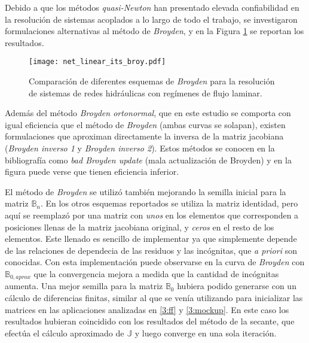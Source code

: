 Debido a que los métodos \textit{quasi-Newton} han presentado elevada confiabilidad en la resolución de sistemas acoplados a lo largo de todo el trabajo,
se investigaron formulaciones alternativas al método de \textit{Broyden},
y en la Figura \ref{net_linear_its_broy} se reportan los resultados.

\begin{figure}[ht]
\centering
\texttt{[image: net\_linear\_its\_broy.pdf]}
\caption[Comparación de diferentes esquemas de \textit{Broyden} para la resolución de sistemas de redes hidráulicas con regímenes de flujo laminar]
{Comparación de diferentes esquemas de \textit{Broyden} para la resolución de sistemas de redes hidráulicas con regímenes de flujo laminar.}
	\label{net_linear_its_broy}
\end{figure}

Además del método \textit{Broyden ortonormal}, que en este estudio se comporta con igual eficiencia que el método de \textit{Broyden} (ambas curvas se solapan),
existen formulaciones que aproximan directamente la inversa de la matriz jacobiana (\textit{Broyden inverso 1} y \textit{Broyden inverso 2}).
Estos métodos se conocen en la bibliografía como \textit{bad Broyden update} (mala actualización de Broyden) \cite{griewank} y en la figura puede verse que tienen eficiencia inferior.

El método de \textit{Broyden} se utilizó también mejorando la semilla inicial para la matriz $\mathbb{B}_n$.
En los otros esquemas reportados se utiliza la matriz identidad,
pero aquí se reemplazó por una matriz con \textit{unos} en los elementos que corresponden a posiciones llenas de la matriz jacobiana original,
y \textit{ceros} en el resto de los elementos.
Este llenado es sencillo de implementar ya que simplemente depende de las relaciones de dependecia de las residuos y las incógnitas, que \textit{a priori} son conocidas.
Con esta implementación puede observarse en la curva de \textit{Broyden} con $\mathbb{B}_{0,aprox}$ que la convergencia mejora a medida que la cantidad de incógnitas aumenta.
Una mejor semilla para la matriz $\mathbb{B}_{0}$ hubiera podido generarse con un cálculo de diferencias finitas,
similar al que se venía utilizando para inicializar las matrices en las aplicaciones analizadas en \ref{3:ff} y \ref{3:mockup}.
En este caso los resultados hubieran coincidido con los resultados del método de la secante, que efectúa el cálculo aproximado de $\mathbb{J}$ y luego converge en una sola iteración.

